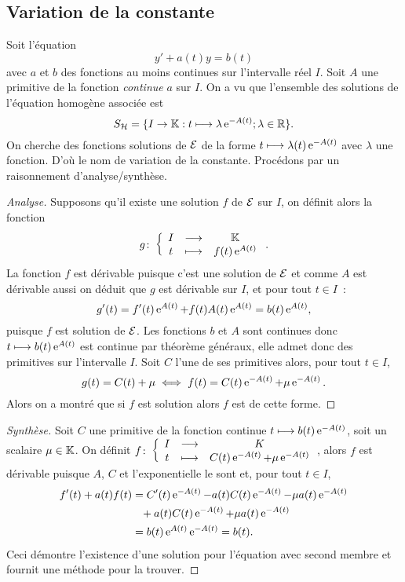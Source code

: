 \subsection{Variation de la constante}
\label{subsec:variationdelaconstante}
Soit l'équation
\begin{equation}
  \label{eq:varcnst}
  y'+a(t)y=b(t)
\end{equation}
avec \(a\) et \(b\) des fonctions au moins continues sur l'intervalle réel \(I\). Soit \(A\) une primitive de la fonction \emph{continue} \(a\) sur \(I\). On a vu que l'ensemble des solutions de l'équation homogène associée est
\begin{equation}
  S_{\mathcal{H}}=\{I \to \mathbb{K} : t \longmapsto \lambda \operatorname{e}^{-A(t)}; \lambda \in \mathbb{R} \}.
\end{equation}
On cherche des fonctions solutions de \(\mathcal{E}\) de la forme \(t \longmapsto \lambda(t)\operatorname{e}^{-A(t)}\) avec \(\lambda\) une fonction. D'où le nom de variation de la constante. Procédons par un raisonnement d'analyse/synthèse.
\begin{proof}[Analyse] Supposons qu'il existe une solution \(f\) de \(\mathcal{E}\) sur \(I\), on définit alors la fonction
  \begin{equation}
    g\colon \left\{\begin{array}{ccc} I & \longrightarrow &\mathbb{K}\\ t & \longmapsto & f(t)\operatorname{e}^{A(t)} \end{array} \right..
  \end{equation}
  La fonction \(f\) est dérivable puisque c'est une solution de \(\mathcal{E}\) et comme \(A\) est dérivable aussi on déduit que \(g\) est dérivable sur \(I\), et pour tout \(t \in I\)~:
\begin{equation}
  g'(t)=f'(t)\operatorname{e}^{A(t)}+f(t)A(t)\operatorname{e}^{A(t)}=b(t)\operatorname{e}^{A(t)},
\end{equation}
puisque \(f\) est solution de \(\mathcal{E}\). Les fonctions \(b\) et \(A\) sont continues donc \(t \longmapsto b(t)\operatorname{e}^{A(t)}\) est continue par théorème généraux, elle admet donc des primitives sur l'intervalle \(I\). Soit \(C\) l'une de ses primitives alors, pour tout \(t \in I\), 
\begin{equation}
  g(t) = C(t) + \mu \iff f(t)=C(t)\operatorname{e}^{-A(t)} + \mu \operatorname{e}^{-A(t)}.
\end{equation}
Alors on a montré que si \(f\) est solution alors \(f\) est de cette forme.
\end{proof}
\begin{proof}[Synthèse] Soit \(C\) une primitive de la fonction continue \(t \longmapsto b(t)\operatorname{e}^{-A(t)}\), soit un scalaire \(\mu \in \mathbb{K}\). On définit \(f\colon \left\{\begin{array}{ccc} I & \longrightarrow &K\\ t & \longmapsto & C(t)\operatorname{e}^{-A(t)}+\mu \operatorname{e}^{-A(t)} \end{array} \right.\), alors \(f\) est dérivable puisque \(A\), \(C\) et l'exponentielle le sont et, pour tout \(t \in I\),
  \begin{align}
    f'(t)+a(t)f(t)&=C'(t) \operatorname{e}^{-A(t)} -a(t)C(t)\operatorname{e}^{-A(t)}-\mu a(t) \operatorname{e}^{-A(t)} \notag \\ 
    &\phantom{=}+ a(t)C(t)\operatorname{e}^{-A(t)} + \mu a(t) \operatorname{e}^{-A(t)} \\ 
    & = b(t) \operatorname{e}^{A(t)} \operatorname{e}^{-A(t)}=b(t).
  \end{align}
Ceci démontre l'existence d'une solution pour l'équation avec second membre et fournit une méthode pour la trouver.
\end{proof}
